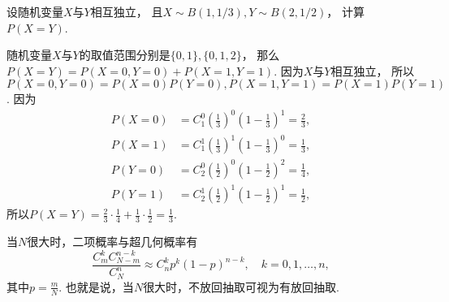 \begin{example}
设随机变量\(X\)与\(Y\)相互独立，
且\(X \sim B(1,1/3),
Y \sim B(2,1/2)\)，
计算\(P(X=Y)\).
\begin{solution}
随机变量\(X\)与\(Y\)的取值范围分别是\(\{0,1\},\{0,1,2\}\)，
那么\(P(X=Y) = P(X=0,Y=0) + P(X=1,Y=1)\).
因为\(X\)与\(Y\)相互独立，
所以\(P(X=0,Y=0) = P(X=0) P(Y=0),
P(X=1,Y=1) = P(X=1) P(Y=1)\).
因为\begin{align*}
	P(X=0) &= C_1^0 \left( \frac13 \right)^0 \left( 1-\frac13 \right)^1
	= \frac23, \\
	P(X=1) &= C_1^1 \left( \frac13 \right)^1 \left( 1-\frac13 \right)^0
	= \frac13, \\
	P(Y=0) &= C_2^0 \left( \frac12 \right)^0 \left( 1-\frac12 \right)^2
	= \frac14, \\
	P(Y=1) &= C_2^1 \left( \frac12 \right)^1 \left( 1-\frac12 \right)^1
	= \frac12,
\end{align*}
所以\(P(X=Y) = \frac23 \cdot \frac14 + \frac13 \cdot \frac12
= \frac13\).
\end{solution}
\end{example}

\begin{theorem}
当\(N\)很大时，二项概率与超几何概率有\[
	\frac{C_m^k C_{N-m}^{n-k}}{C_N^n}
	\approx
	C_n^k p^k (1-p)^{n-k}, \quad k=0,1,\dotsc,n,
\]
其中\(p=\frac{m}{N}\).
也就是说，当\(N\)很大时，不放回抽取可视为有放回抽取.
\end{theorem}

